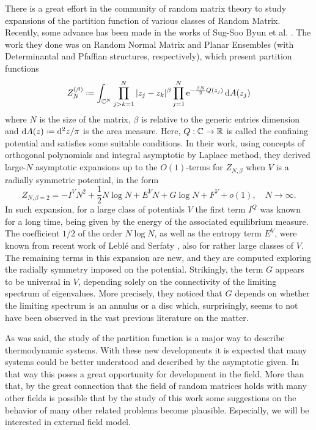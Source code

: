\documentclass[12pt]{report}
\begin{document}
There is a great effort in the community of random matrix theory to study expansions of the partition function of various classes of Random Matrix. Recently, some advance has been made in the works of Sug-Soo Byun et al. \cite{Byun_2023}. The work they done was on Random Normal Matrix and Planar Ensembles (with Determinantal and Pfaffian structures, respectively), which present partition functions
\begin{equation}
	Z_N^{(\beta)} \deff \int_{\C^N}  \prod_{j>k=1}^{N} |z_j - z_k|^\beta \prod_{j=1}^{N} \ee^{-\frac{\beta N}{2} Q(z_j)} \dd A(z_j)
\end{equation}
where $N$ is the size of the matrix, $\beta$ is relative to the generic entries dimension and $\dd A(z) \deff \dd^2 z/\pi$ is the area measure. Here, $Q: \mathbb{C} \rightarrow \mathbb{R}$ is called the confining potential and satisfies some suitable conditions. In their work, using concepts of orthogonal polynomials and integral asymptotic by Laplace method, they derived large-$N$ asymptotic expansions up to the $O(1)$-terms for  $Z_{N,\beta}$ when $V$ is a radially symmetric potential, in the form
%
$$
Z_{N,\beta=2}=-I^VN^2+\frac{1}{2}N\log N+E^V N+G\log N+F^V + o(1),\quad N\to \infty.
$$
%
In such expansion, for a large class of potentials $V$ the first term $I^Q$ was known for a long time, being given by the energy of the associated equilibrium measure. The coefficient $1/2$ of the order $N\log N$, as well as the entropy term $E^V$, were known from recent work of Leblé and Serfaty \cite{Leble2017-yj}, also for rather large classes of $V$. The remaining terms in this expansion are new, and they are computed exploring the radially symmetry imposed on the potential. Strikingly, the term $G$ appears to be universal in $V$, depending solely on the connectivity of the limiting spectrum of eigenvalues. More precisely, they noticed that $G$ depends on whether the limiting spectrum is an annulus or a disc which, surprisingly, seems to not have been observed in the vast previous literature on the matter. 

As was said, the study of the partition function is a major way to describe thermodynamic systems. With these new developments it is expected that many systems could be better understood and described by the asymptotic given. In that way this poses a great opportunity for development in the field. More than that, by the great connection that the field of random matrices holds with many other fields is possible that by the study of this work some suggestions on the behavior of many other related problems become plausible. Especially, we will be interested in external field model.
\end{document}
